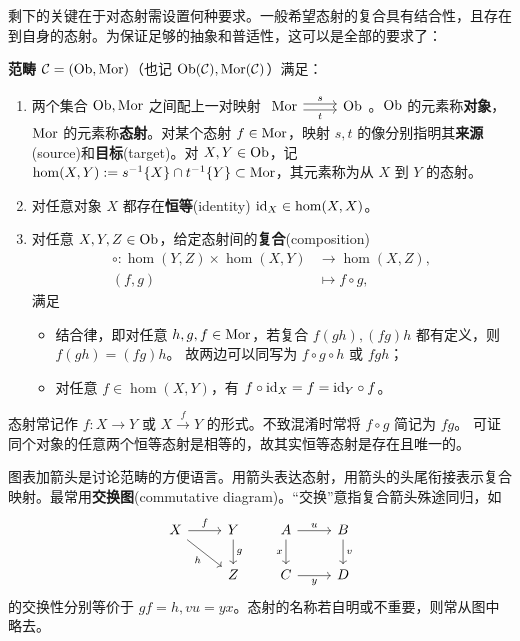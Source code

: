 剩下的关键在于对态射需设置何种要求。一般希望态射的复合具有结合性，且存在到自身的态射。为保证足够的抽象和普适性，这可以是全部的要求了：
\begin{definition} \textbf{范畴} $\mathcal C=(\operatorname{Ob},\operatorname{Mor})$（也记 $\operatorname{Ob}(\mathcal C),\operatorname{Mor}(\mathcal C)$）满足：
	\begin{enumerate}
		\item 两个集合 $\operatorname{Ob},\operatorname{Mor}$ 之间配上一对映射
     $\begin{tikzcd} \Mor \arrow[yshift=-0.5ex, r, "t"'] \arrow[yshift=0.5ex, r, "s"] & \Obj \end{tikzcd}$。$\operatorname{Ob}$ 的元素称\textbf{对象}，$\operatorname{Mor}$ 的元素称\textbf{态射}。对某个态射 $f\in\operatorname{Mor}$，映射 $s,t$ 的像分别指明其\textbf{来源}(source)和\textbf{目标}(target)。对 $X, Y \in \operatorname{Ob}$，记 $\hom(X, Y) := s^{-1}\{X\} \cap t^{-1}\{Y\}\subset\operatorname{Mor}$，其元素称为从 $X$ 到 $Y$ 的态射。
		\item 对任意对象 $X$ 都存在\textbf{恒等}(identity) $\mathrm{id}_X \in \hom(X, X)$。
		\item 对任意 $X, Y, Z \in \operatorname{Ob}$，给定态射间的\textbf{复合}(composition)
        \begin{align*}
            \circ : \hom(Y, Z) \times \hom(X, Y) & \longrightarrow \hom(X, Z),\\
            (f, g) & \longmapsto f \circ g,
        \end{align*}
        满足
        \begin{itemize}
            \item 结合律，即对任意 $h, g, f \in \operatorname{Mor}$，若复合 $f(gh), (fg)h$ 都有定义，则 $f (g h) = (f g) h$。
            故两边可以同写为 $f \circ g \circ h$ 或 $fgh$；
            \item 对任意 $f \in \hom(X,Y)$，有 $f \circ \mathrm{id}_X = f = \mathrm{id}_Y \circ f$。
        \end{itemize}
	\end{enumerate}
\end{definition}

\begin{remark}
	态射常记作 $f:X\to Y$ 或 $X\xrightarrow{f} Y$ 的形式。不致混淆时常将 $f \circ g$ 简记为 $fg$。
可证同个对象的任意两个恒等态射是相等的，故其实恒等态射是存在且唯一的。
\end{remark}

图表加箭头是讨论范畴的方便语言。用箭头表达态射，用箭头的头尾衔接表示复合映射。最常用\textbf{交换图}(commutative diagram)。“交换”意指复合箭头殊途同归，如
    \[ \begin{tikzcd}
        X \arrow[r, "f"] \arrow[rd, "h"'] & Y \arrow[d, "g"] \\
        & Z
    \end{tikzcd} \qquad \begin{tikzcd}
        A \arrow[r, "u"] \arrow[d, "x"'] & B \arrow[d, "v"] \\
        C \arrow[r, "y"'] & D
    \end{tikzcd} \]
的交换性分别等价于 $g f = h, v u = y x$。态射的名称若自明或不重要，则常从图中略去。

